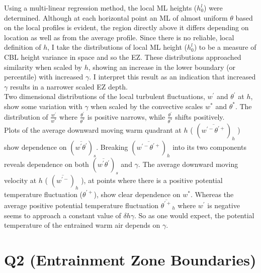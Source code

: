 Using a multi-linear regression method, the local \acs{ML} heights ($h^{l}_{0}$) 
were determined.  Although at each horizontal point an \acs{ML} of almost uniform $\theta$ based on the local profiles is evident, the region directly above it differs depending on location as well as from the average profile. 
Since there is no reliable, local definition of $h$, 
I take the distributions of local \acs{ML} height ($h^{l}_{0}$) to be a measure of \acs{CBL} height variance in space and so the \acs{EZ}.
 These distributions approached similarity when scaled by $h$, showing an increase in the lower 
boundary (or percentile) with increased $\gamma$.  I interpret this result as an indication that increased $\gamma$ results in a narrower scaled \acs{EZ} depth.\\

Two dimensional distributions of the local turbulent fluctuations, $w^{'}$ and $\theta^{'}$ at $h$, show some variation with $\gamma$ when scaled by the convective scales $w^{*}$ and $\theta^{*}$.  The distribution of $\frac{w^{'}}{w^{*}}$ where $\frac{\theta^{'}}{\theta^{*}}$ is positive narrows, while $\frac{\theta^{'}}{\theta^{*}}$ shifts positively.\\

Plots of the average downward moving warm quadrant at $h$ ( $(\overline{w^{'-}\theta^{'+}})_{h}$ ) show dependence on $(\overline{w^{'}\theta^{'}})_{s}$. Breaking $(\overline{w^{'-}\theta^{'+}})_{h}$ into its two components reveals dependence on both $(\overline{w^{'}\theta^{'}})_{s}$ and $\gamma$. The average downward moving velocity at $h$ ( $(\overline{w^{'-}})_{h}$ ), at points where there is a positive potential temperature fluctuation ($\theta^{'+}$), show clear dependence on $w^{*}$.  Whereas the average positive potential temperature fluctuation $\overline{\theta^{'+}}_{h}$ where $w^{'}$ is negative seems to approach a constant value of $\delta h \gamma$. So as one would expect, the potential temperature of the entrained warm air depends on $\gamma$.

\clearpage



\section{Q2 (Entrainment Zone Boundaries)}
\label{sec:deltahri}
\FloatBarrier
